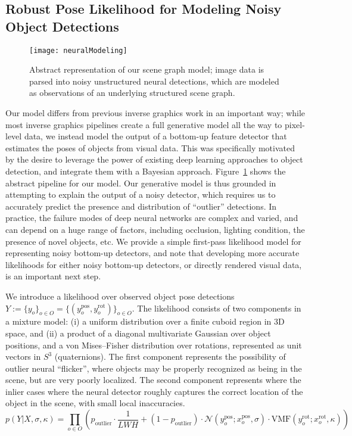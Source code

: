 \subsection{Robust Pose Likelihood for Modeling Noisy Object Detections}
\begin{figure}[H]
  \texttt{[image: neuralModeling]}
  \caption{
    Abstract representation of our scene graph model; image data is parsed into noisy unstructured neural detections, which are modeled as observations of an underlying structured scene graph.
  }
  \label{fig:neuralModeling}
\end{figure}
Our model differs from previous inverse graphics work in an important way; while most inverse graphics pipelines create a full generative model all the way to pixel-level data, we instead model the output of a bottom-up feature detector that estimates the poses of objects from visual data.
This was specifically motivated by the desire to leverage the power of existing deep learning approaches to object detection, and integrate them with a Bayesian approach.
Figure~\ref{fig:neuralModeling} shows the abstract pipeline for our model.
Our generative model is thus grounded in attempting to explain the output of a noisy detector, which requires us to accurately predict the presence and distribution of ``outlier'' detections.
In practice, the failure modes of deep neural networks are complex and varied, and can depend on a huge range of factors, including occlusion, lighting condition, the presence of novel objects, etc.
We provide a simple first-pass likelihood model for representing noisy bottom-up detectors, and note that developing more accurate likelihoods for either noisy bottom-up detectors, or directly rendered visual data, is an important next step.

We introduce a likelihood over observed object pose detections $Y := \{y_o\}_{o \in O} = \{(y_o^\mathrm{pos}, y_o^\mathrm{rot})\}_{o \in O}$.
The likelihood consists of two components in a mixture model:
(i) a uniform distribution over a finite cuboid region in 3D space, and
(ii) a product of a diagonal multivariate Gaussian over object positions, and a von Mises--Fisher distribution over rotations, represented as unit vectors in $S^3$ (quaternions).
The first component represents the possibility of outlier neural ``flicker'', where objects may be properly recognized as being in the scene, but are very poorly localized.
The second component represents where the inlier cases where the neural detector roughly captures the correct location of the object in the scene, with small local inaccuracies.
\begin{equation} \label{eq:noisy-pose-likelihood}
  p(Y | X, \sigma, \kappa) =
  \prod_{o \in O}
    \left(p_\mathrm{outlier} \cdot \frac{1}{LWH} +
    (1 - p_\mathrm{outlier}) \cdot \mathcal{N}\left(y_o^\mathrm{pos}; x_o^\mathrm{pos}, \sigma\right) \cdot
    \mathrm{VMF}(y_o^\mathrm{rot}; x_o^\mathrm{rot}, \kappa)\right)
\end{equation}


